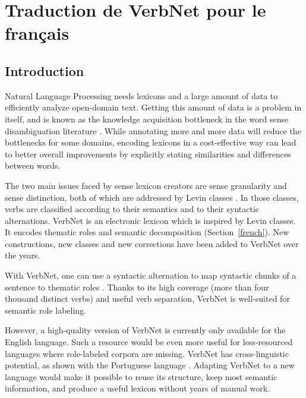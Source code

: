 \chapter{Traduction de VerbNet pour le français}
\label{ch:verbnet}

\section{Introduction}

Natural Language Processing needs lexicons and a large amount of data to
efficiently analyze open-domain text. Getting this amount of data is a problem
in itself, and is known as the knowledge acquisition bottleneck in the word
sense disambiguation literature \citep{gale1992using}. While annotating more
and more data will reduce the bottlenecks for some domains, encoding lexicons
in a cost-effective way can lead to better overall improvements by explicitly
stating similarities and differences between words.

The two main issues faced by sense lexicon creators are sense granularity and
sense distinction, both of which are addressed by Levin classes
\citep{levin1993english}. In those classes, verbs are classified according
to their semantics and to their syntactic alternations. VerbNet
\citep{kipperschuler2005verbnet} is an electronic lexicon which is inspired
by Levin classes. It encodes thematic roles and semantic decomposition
(Section~\ref{french}).  New constructions, new classes and new corrections
have been added to VerbNet over the years.

With VerbNet, one can use a syntactic alternation to map syntactic chunks of a
sentence to thematic roles \citep{swier2005exploiting,pradet2013revisiting}.
Thanks to its high coverage (more than four thousand distinct verbs) and useful
verb separation, VerbNet is well-suited for semantic role labeling.

However, a high-quality version of VerbNet is currently only available for the
English language. Such a resource would be even more useful for less-resourced
languages where role-labeled corpora are missing. VerbNet has cross-linguistic
potential, as shown with the Portuguese language \citep[section
2.2.2]{kipperschuler2005verbnet}. Adapting VerbNet to a new language would make
it possible to reuse its structure, keep most semantic information, and produce
a useful lexicon without years of manual work.


